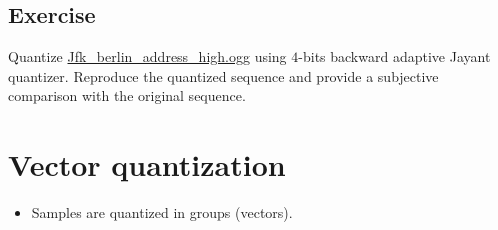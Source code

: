 \subsection{Exercise}
Quantize
\href{https://upload.wikimedia.org/wikipedia/commons/3/3a/Jfk_berlin_address_high.ogg}{Jfk\_berlin\_address\_high.ogg}
using \(4\)-bits backward adaptive Jayant quantizer. Reproduce the
quantized sequence and provide a subjective comparison with the original
sequence.

\section{Vector quantization}
\begin{itemize}
\item Samples are quantized in groups (vectors).
\end{itemize}
  



